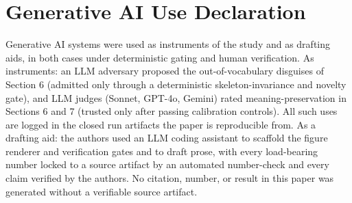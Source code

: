 \documentclass[sigconf,anonymous,review]{acmart}
\begin{document}
\label{end-of-body}
\nocite{*}



\label{end-of-bib}
\appendix

\section{Generative AI Use Declaration}
Generative AI systems were used as instruments of the study and as drafting aids, in both cases under deterministic gating and human verification. As instruments: an LLM adversary proposed the out-of-vocabulary disguises of Section 6 (admitted only through a deterministic skeleton-invariance and novelty gate), and LLM judges (Sonnet, GPT-4o, Gemini) rated meaning-preservation in Sections 6 and 7 (trusted only after passing calibration controls). All such uses are logged in the closed run artifacts the paper is reproducible from. As a drafting aid: the authors used an LLM coding assistant to scaffold the figure renderer and verification gates and to draft prose, with every load-bearing number locked to a source artifact by an automated number-check and every claim verified by the authors. No citation, number, or result in this paper was generated without a verifiable source artifact.


\label{end-of-appendix}
\end{document}
